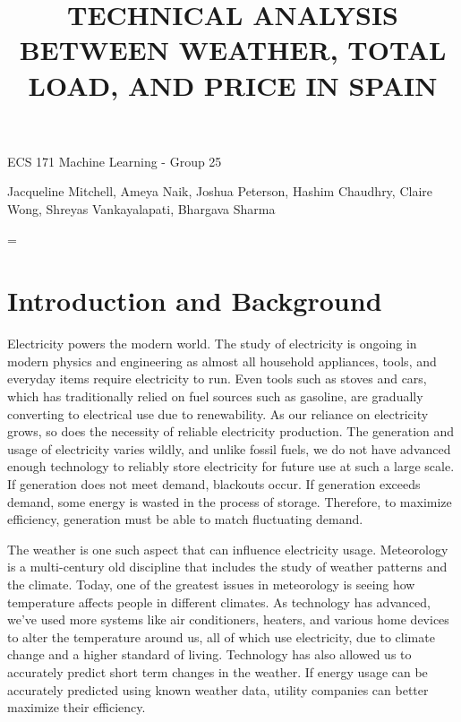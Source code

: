 \documentclass[10pt]{article}
\title{\renewcommand{\baselinestretch}{1.17}\normalsize\bf%
\uppercase{Technical Analysis Between Weather, Total Load, and Price in Spain}
}
\begin{document}
\date{}
\maketitle

\vspace{-0.5cm}

\begin{center}
{\footnotesize 
ECS 171 Machine Learning - Group 25
}
\end{center}

\begin{center}
{\footnotesize 
Jacqueline Mitchell, Ameya Naik, Joshua Peterson, Hashim Chaudhry, Claire Wong, Shreyas Vankayalapati, Bhargava Sharma
}
\end{center}
\bigskip
\noindent


\baselineskip=\normalbaselineskip

\section{Introduction and Background}\label{sec:1}

Electricity powers the modern world. The study of electricity is ongoing in modern physics and engineering as almost all household appliances, tools, and everyday items require electricity to run. Even tools such as stoves and cars, which has traditionally relied on fuel sources such as gasoline, are gradually converting to electrical use due to renewability. As our reliance on electricity grows, so does the necessity of reliable electricity production. The generation and usage of electricity varies wildly, and unlike fossil fuels, we do not have advanced enough technology to reliably store electricity for future use at such a large scale. If generation does not meet demand, blackouts occur. If generation exceeds demand, some energy is wasted in the process of storage. Therefore, to maximize efficiency, generation must be able to match fluctuating demand. 

The weather is one such aspect that can influence electricity usage. Meteorology is a multi-century old discipline that includes the study of weather patterns and the climate. Today, one of the greatest issues in meteorology is seeing how temperature affects people in different climates. As technology has advanced, we've used more systems like air conditioners, heaters, and various home devices to alter the temperature around us, all of which use electricity, due to climate change and a higher standard of living. Technology has also allowed us to accurately predict short term changes in the weather. If energy usage can be accurately predicted using known weather data, utility companies can better maximize their efficiency. 
\end{document}
